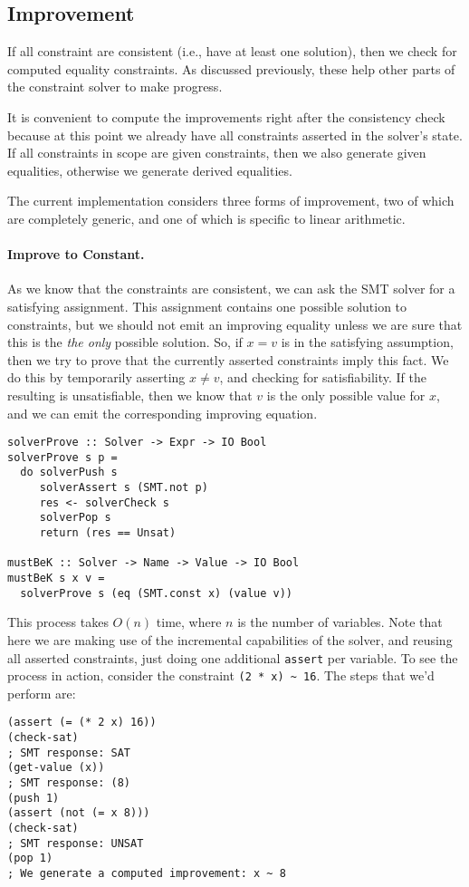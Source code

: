 \documentclass{sigplanconf}
\begin{document}
\subsection{Improvement}

If all constraint are consistent (i.e., have at least one solution),
then we check for computed equality constraints.  As discussed previously,
these help other parts of the constraint solver to make progress.

It is convenient to compute the improvements right after the consistency
check because at this point we already have all constraints asserted
in the solver's state.  If all constraints in scope are given constraints,
then we also generate given equalities, otherwise we generate derived
equalities.

The current implementation considers three forms of improvement,
two of which are completely generic, and one of which is specific to
linear arithmetic.

\paragraph{Improve to Constant.} As we know that the constraints are
consistent, we can ask the SMT solver for a satisfying assignment.
This assignment contains one possible solution to constraints, but
we should not emit an improving equality unless we are sure that
this is the {\em the only} possible solution.  So, if $x = v$ is
in the satisfying assumption, then we try to prove that the currently
asserted constraints imply this fact.  We do this by temporarily asserting
$x \neq v$, and checking for satisfiability.  If the resulting is unsatisfiable,
then we know that $v$ is the only possible value for $x$,
and we can emit the corresponding improving equation.
\begin{Verbatim}
solverProve :: Solver -> Expr -> IO Bool
solverProve s p =
  do solverPush s
     solverAssert s (SMT.not p)
     res <- solverCheck s
     solverPop s
     return (res == Unsat)

mustBeK :: Solver -> Name -> Value -> IO Bool
mustBeK s x v =
  solverProve s (eq (SMT.const x) (value v))
\end{Verbatim}
This process takes $O(n)$ time, where $n$ is the number of variables.
Note that here we are making use of the incremental capabilities of the
solver, and reusing all asserted constraints, just doing one
additional \Verb"assert" per variable. To see the process in action,
consider the constraint \Verb"(2 * x) ~ 16".  The steps that we'd perform
are:
\begin{Verbatim}
(assert (= (* 2 x) 16))
(check-sat)
; SMT response: SAT
(get-value (x))
; SMT response: (8)
(push 1)
(assert (not (= x 8)))
(check-sat)
; SMT response: UNSAT
(pop 1)
; We generate a computed improvement: x ~ 8
\end{Verbatim}
\end{document}
